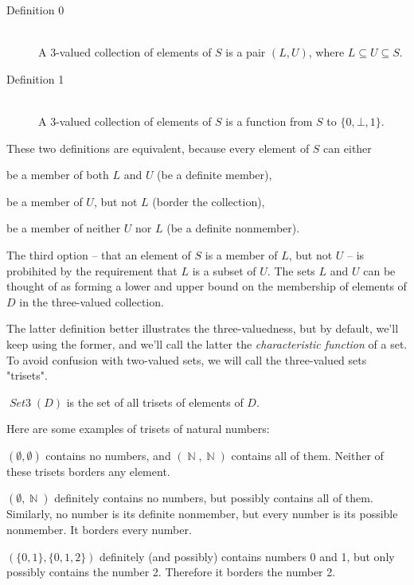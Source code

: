 \documentclass[oneside,12pt]{book}
\theoremstyle{definition}
\theoremstyle{remark}
\newcommand\var[1]{\mathop{\mathit{#1}}\nolimits}
\newcommand{\SetIII}{\var{Set3}}
\newcommand{\Nat}{\var{\mathbb{N}}}
\begin{document}
\begin{defBox}
  \begin{description}
    \item[Definition 0] \hfill \\
      A 3-valued collection of elements of $S$ is a pair $(L, U)$, where
      $L \subseteq U \subseteq S$.
    \item[Definition 1] \hfill \\
      A 3-valued collection of elements of $S$ is a function from $S$
      to $\{ 0, \bot, 1 \}$.
  \end{description}
\end{defBox}

\noindent These two definitions are equivalent, because every element of $S$ can either
\begin{compactenum}
  \item be a member of both $L$ and $U$ (be a definite member),
  \item be a member of $U$, but not $L$ (border the collection),
  \item be a member of neither $U$ nor $L$ (be a definite nonmember).
\end{compactenum}

\medskip \noindent The third option -- that an element of $S$ is a member of $L$,
but not $U$ -- is probihited by the requirement that $L$ is a subset of $U$.
The sets $L$ and $U$ can be thought of as forming a lower and upper bound on
the membership of elements of $D$ in the three-valued collection.

The latter definition better illustrates the three-valuedness, but by default,
we’ll keep using the former, and we'll call the latter the \textit{characteristic
function} of a set. To avoid confusion with two-valued sets, we will
call the three-valued sets "trisets".

\begin{defBox}
  $\SetIII(D)$ is the set of all trisets of elements of $D$.
\end{defBox}

\begin{exampleBox}
  Here are some examples of trisets of natural numbers:
  
  \medskip \noindent $(\emptyset, \emptyset)$ contains no numbers, and
  $(\Nat, \Nat)$ contains all of them. Neither of these trisets
  borders any element.
  
  \medskip \noindent $(\emptyset, \Nat)$ definitely contains no numbers,
  but possibly contains all of them. Similarly, no number is its definite nonmember,
  but every number is its possible nonmember. It borders every number.
  
  \medskip \noindent $(\{ 0, 1 \}, \{ 0, 1, 2 \})$ definitely (and possibly)
  contains numbers 0 and 1, but only possibly contains the number 2. Therefore
  it borders the number 2.
\end{exampleBox}
\end{document}
